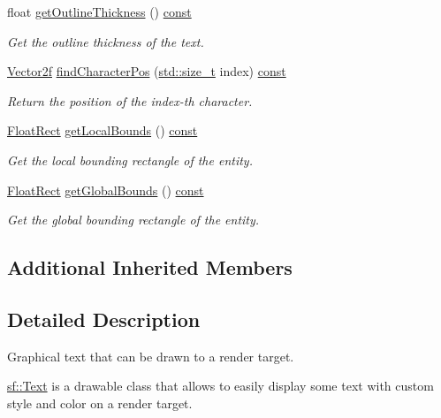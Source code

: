 \begin{DoxyCompactItemize}
float \hyperlink{classsf_1_1_text_acee9ab697133e19bb91be87beced2483}{get\-Outline\-Thickness} () \hyperlink{term__entry_8h_a57bd63ce7f9a353488880e3de6692d5a}{const} 
\begin{DoxyCompactList}\small\item\em Get the outline thickness of the text. \end{DoxyCompactList}\item 
\hyperlink{namespacesf_a80cea3c46537294fd1d8d428566ad8b2}{Vector2f} \hyperlink{classsf_1_1_text_adf120ed4159e43daa782b17fea23ea82}{find\-Character\-Pos} (\hyperlink{nc__alloc_8h_a7b60c5629e55e8ec87a4547dd4abced4}{std\-::size\-\_\-t} index) \hyperlink{term__entry_8h_a57bd63ce7f9a353488880e3de6692d5a}{const} 
\begin{DoxyCompactList}\small\item\em Return the position of the {\itshape index-\/th} character. \end{DoxyCompactList}\item 
\hyperlink{namespacesf_ab0d978f5903922a6bdfca1736b71ccc9}{Float\-Rect} \hyperlink{classsf_1_1_text_a8a766ea03a1b8899cd1542765771a4ae}{get\-Local\-Bounds} () \hyperlink{term__entry_8h_a57bd63ce7f9a353488880e3de6692d5a}{const} 
\begin{DoxyCompactList}\small\item\em Get the local bounding rectangle of the entity. \end{DoxyCompactList}\item 
\hyperlink{namespacesf_ab0d978f5903922a6bdfca1736b71ccc9}{Float\-Rect} \hyperlink{classsf_1_1_text_a95d732f58bd12bf7ec388b106f3729ba}{get\-Global\-Bounds} () \hyperlink{term__entry_8h_a57bd63ce7f9a353488880e3de6692d5a}{const} 
\begin{DoxyCompactList}\small\item\em Get the global bounding rectangle of the entity. \end{DoxyCompactList}\end{DoxyCompactItemize}
\subsection*{Additional Inherited Members}


\subsection{Detailed Description}
Graphical text that can be drawn to a render target. 

\hyperlink{classsf_1_1_text}{sf\-::\-Text} is a drawable class that allows to easily display some text with custom style and color on a render target.

